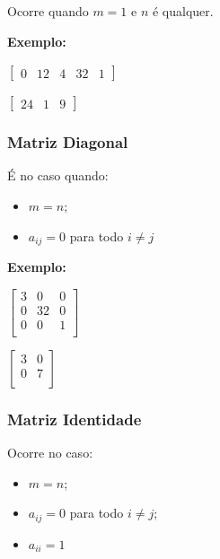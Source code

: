 \documentclass[oneside,a4paper,12pt]{article}
\begin{document}
Ocorre quando $m=1$ e $n$ é qualquer.

\textbf{Exemplo: }

\begin{multicols}{2}
	$
	\left[
	\begin{array}{ccccc}
	0	&	12	&	4	&	32	&	1
	\end{array}
	\right]
	$
	
	$
	\left[
	\begin{array}{ccc}
	24	&	1	&	9
	\end{array}
	\right]
	$
	
\end{multicols}

\subsubsection{Matriz Diagonal}

É no caso quando:
\begin{itemize}
	\item $m=n$;
	\item $a_{ij}=0$ para todo $i \neq j$
\end{itemize}

\textbf{Exemplo: }

\begin{multicols}{2}
	$
	\left[
	\begin{array}{ccc}
	3	&	0	&	0	\\
	0	&	32	&	0	\\
	0	&	0	&	1	\\
	\end{array}
	\right]
	$
	
	$
	\left[
	\begin{array}{cc}
	3	&	0	\\
	0	&	7	\\
	\end{array}
	\right]
	$
	
\end{multicols}

\subsubsection{Matriz Identidade}

Ocorre no caso:
\begin{itemize}
	\item $m=n$;
	\item $a_{ij}=0$ para todo $i \neq j$;
	\item $a_{ii}=1$
\end{itemize}
\end{document}
